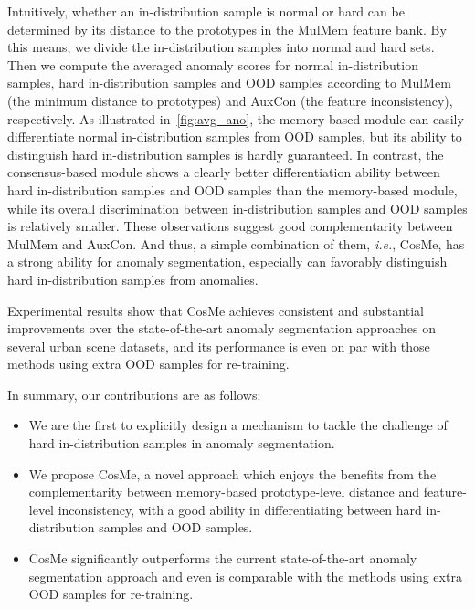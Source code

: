 \documentclass[10pt,twocolumn,letterpaper]{article}
\begin{document}
Intuitively, whether an in-distribution sample is normal or hard can be determined by its distance to the prototypes in the MulMem feature bank. By this means, we divide the in-distribution samples into normal and hard sets. Then we compute the averaged anomaly scores for normal in-distribution samples, hard in-distribution samples and OOD samples according to MulMem (the minimum distance to prototypes) and AuxCon (the feature inconsistency), respectively. As illustrated in~\cref{fig:avg_ano}, the memory-based module can easily differentiate normal in-distribution samples from OOD samples, but its ability to distinguish hard in-distribution samples is hardly guaranteed. In contrast, the consensus-based module shows a clearly better differentiation ability between hard in-distribution samples and OOD samples than the memory-based module, while its overall discrimination between in-distribution samples and OOD samples is relatively smaller. These observations suggest good complementarity between MulMem and AuxCon. And thus, a simple combination of them, \emph{i.e.}, CosMe, has a strong ability for anomaly segmentation, especially can favorably distinguish hard in-distribution samples from anomalies.


Experimental results show that CosMe achieves consistent and substantial improvements over the state-of-the-art anomaly segmentation approaches on several urban scene datasets, and its performance is even on par with those methods using extra OOD samples for re-training.

















In summary, our contributions are as follows:
\begin{itemize}
\item
We are the first to explicitly design a mechanism to tackle the challenge of hard in-distribution samples in anomaly segmentation.
\item We propose CosMe, a novel approach which enjoys the benefits from the complementarity between memory-based prototype-level distance and feature-level inconsistency, with a good ability in differentiating between hard in-distribution samples and OOD samples.
 \item CosMe significantly outperforms the current state-of-the-art anomaly segmentation approach and even is comparable with the methods using extra OOD samples for re-training.
\end{itemize}
\end{document}
